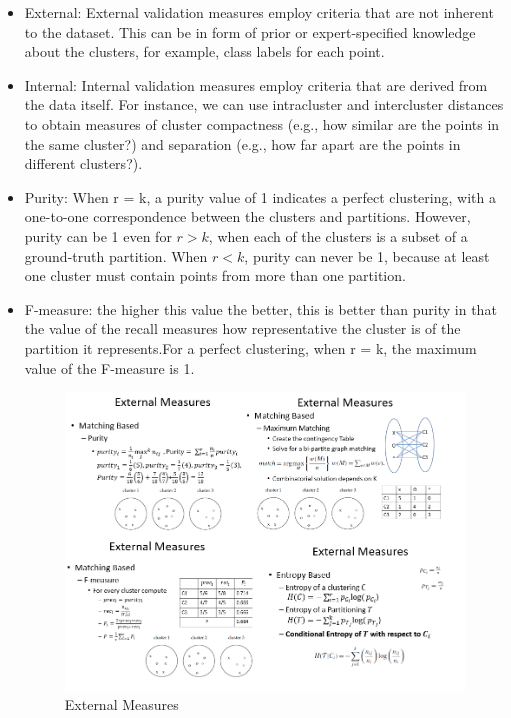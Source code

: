 \begin{itemize}
    \item External: External validation measures employ criteria that are not inherent to the dataset. This can be in form of prior or expert-specified knowledge about the clusters, for example, class labels for each point.
    \item Internal: Internal validation measures employ criteria that are derived from the data
    itself. For instance, we can use intracluster and intercluster distances to obtain measures of cluster compactness (e.g., how similar are the points in the same cluster?) and separation (e.g., how far apart are the points in different clusters?).
    \item Purity: When r = k, a purity value of 1
    indicates a perfect clustering, with a one-to-one correspondence between the clusters
    and partitions. However, purity can be 1 even for $r > k$, when each of the clusters is a
    subset of a ground-truth partition. When $r < k$, purity can never be 1, because at least one cluster must contain points from more than one partition.
    \item F-measure: the higher this value the better, this is better than purity in that the value of the recall measures how representative the cluster is of the partition it represents.For a perfect clustering, when r = k, the maximum value of the F-measure is 1.
    \begin{figure}[H]
        \centerline{\includegraphics[width=1.5\textwidth]{Figures/externalmes.png}}
        \caption{\label{fig:figure11}External Measures}
    \end{figure}

\end{itemize}
